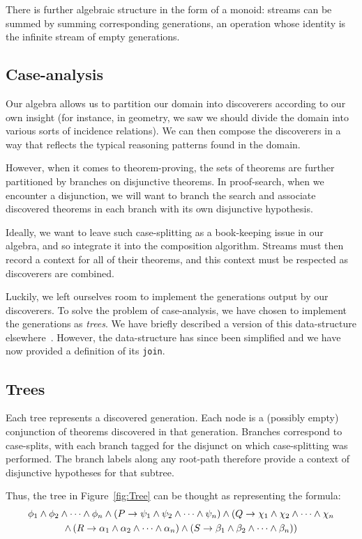 There is further algebraic structure in the form of a monoid: streams can be summed by summing corresponding generations, an operation whose identity is the infinite stream of empty generations. 

\subsection{Case-analysis}
Our algebra allows us to partition our domain into discoverers according to our own insight (for instance, in geometry, we saw we should divide the domain into various sorts of incidence relations). We can then compose the discoverers in a way that reflects the typical reasoning patterns found in the domain.

However, when it comes to theorem-proving, the sets of theorems are further partitioned by branches on disjunctive theorems. In proof-search, when we encounter a disjunction, we will want to branch the search and associate discovered theorems in each branch with its own disjunctive hypothesis. 

Ideally, we want to leave such case-splitting as a book-keeping issue in our algebra, and so integrate it into the composition algorithm. Streams must then record a context for all of their theorems, and this context must be respected as discoverers are combined. 

Luckily, we left ourselves room to implement the generations output by our discoverers. To solve the problem of case-analysis, we have chosen to implement the generations as \emph{trees}. We have briefly described a version of this data-structure elsewhere~\cite{ScottComposable}. However, the data-structure has since been simplified and we have now provided a definition of its \texttt{join}.

\subsection{Trees}
Each tree represents a discovered generation. Each node is a (possibly empty) conjunction of theorems discovered in that generation. Branches correspond to  case-splits, with each branch tagged for the disjunct on which case-splitting was performed. The branch labels along any root-path therefore provide a context of disjunctive hypotheses for that subtree.

Thus, the tree in Figure~\ref{fig:Tree} can be thought as representing the formula:
\begin{multline*}
\phi_1\wedge\phi_2\wedge\cdots\wedge\phi_n\wedge\left(P\rightarrow\psi_1\wedge\psi_2\wedge\cdots\wedge\psi_n\right)
\wedge(Q\rightarrow\chi_1\wedge\chi_2\wedge\cdots\wedge\chi_n\\
\wedge\left(R\rightarrow\alpha_1\wedge\alpha_2\wedge\cdots\wedge\alpha_n\right)\wedge\left(S\rightarrow\beta_1\wedge\beta_2\wedge\cdots\wedge\beta_n\right))
\end{multline*}


